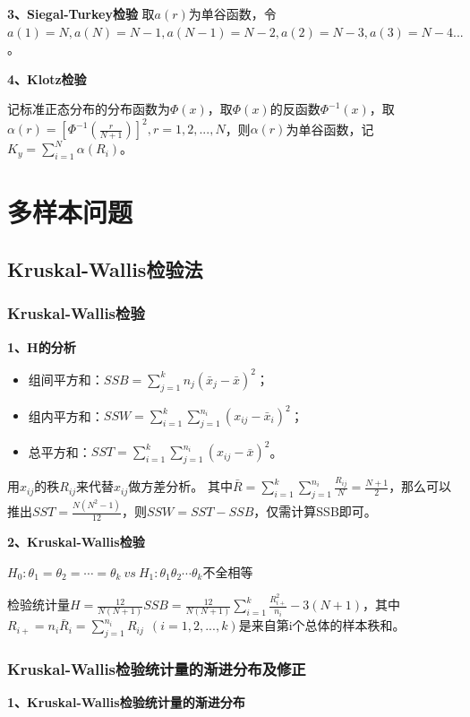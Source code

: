 \documentclass[lang=cn,10pt]{elegantbook}
\begin{document}
\textbf{3、Siegal-Turkey检验}
取$a(r)$为单谷函数，令$a(1) = N,a(N) = N-1, a(N-1) = N-2, a(2) = N-3, a(3) = N-4...$。


\textbf{4、Klotz检验}

记标准正态分布的分布函数为$\Phi(x)$，取$\Phi(x)$的反函数$\Phi^{-1}(x)$，取$\alpha(r) = [\Phi^{-1}(\frac{r}{N+1})]^2,r = 1,2,...,N$，则$\alpha(r)$为单谷函数，记$K_y = \sum_{i = 1}^N\alpha(R_i)$。

\chapter{多样本问题}
\section{Kruskal-Wallis检验法}
\subsection{Kruskal-Wallis检验}
\textbf{1、H的分析}

\begin{itemize}
    \item 组间平方和：$SSB = \sum_{j = 1}^kn_j (\bar{x}_j - \bar{x})^2$；
    \item 组内平方和：$SSW = \sum_{i = 1}^k\sum_{j = 1}^{n_i}(x_{ij} - \bar{x}_i)^2$；
    \item 总平方和：$SST = \sum_{i = 1}^k\sum_{j = 1}^{n_i}(x_{ij} - \bar{x})^2$。
\end{itemize}

用$x_{ij}$的秩$R_{ij}$来代替$x_{ij}$做方差分析。
其中$\bar{R} = \sum_{i = 1}^k\sum_{j = 1}^{n_i}\frac{R_{ij}}N = \frac{N+1}2$，那么可以推出$SST = \frac{N(N^2 - 1)}{12}$，则$SSW = SST - SSB$，仅需计算SSB即可。

\textbf{2、Kruskal-Wallis检验}

\begin{center}
    $H_0:\theta_1 = \theta_2 = \cdots = \theta_k ~vs~ H_1: \theta_1 \theta_2 \cdots \theta_k$不全相等
\end{center}

检验统计量$H = \frac{12}{N(N+1)}SSB = \frac{12}{N(N+1)}\sum_{i = 1}^k\frac{R_{i+}^2}{n_i} - 3 (N+1)$，其中$R_{i+} = n_i\bar{R}_i = \sum_{j = 1}^{n_i}R_{ij}~~(i = 1,2,...,k)$是来自第i个总体的样本秩和。

\subsection{Kruskal-Wallis检验统计量的渐进分布及修正}
\textbf{1、Kruskal-Wallis检验统计量的渐进分布}
\end{document}
